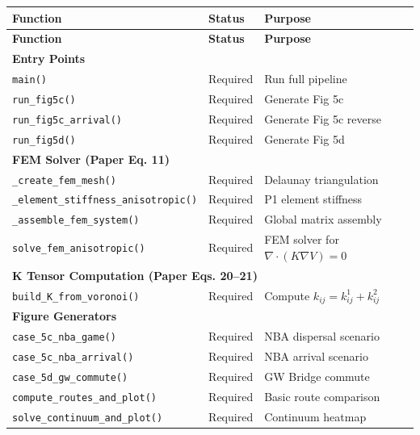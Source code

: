 \documentclass[11pt]{article}
\begin{document}
\begin{longtable}{p{5.5cm}p{2cm}p{6cm}}
\toprule
\textbf{Function} & \textbf{Status} & \textbf{Purpose} \\
\midrule
\endfirsthead
\toprule
\textbf{Function} & \textbf{Status} & \textbf{Purpose} \\
\midrule
\endhead

\multicolumn{3}{l}{\textbf{Entry Points}} \\
\midrule
\texttt{main()} & \textcolor{required}{Required} & Run full pipeline \\
\texttt{run\_fig5c()} & \textcolor{required}{Required} & Generate Fig 5c \\
\texttt{run\_fig5c\_arrival()} & \textcolor{required}{Required} & Generate Fig 5c reverse \\
\texttt{run\_fig5d()} & \textcolor{required}{Required} & Generate Fig 5d \\
\midrule

\multicolumn{3}{l}{\textbf{FEM Solver (Paper Eq. 11)}} \\
\midrule
\texttt{\_create\_fem\_mesh()} & \textcolor{required}{Required} & Delaunay triangulation \\
\texttt{\_element\_stiffness\_anisotropic()} & \textcolor{required}{Required} & P1 element stiffness \\
\texttt{\_assemble\_fem\_system()} & \textcolor{required}{Required} & Global matrix assembly \\
\texttt{solve\_fem\_anisotropic()} & \textcolor{required}{Required} & FEM solver for $\nabla \cdot (K\nabla V) = 0$ \\
\midrule

\multicolumn{3}{l}{\textbf{K Tensor Computation (Paper Eqs. 20--21)}} \\
\midrule
\texttt{build\_K\_from\_voronoi()} & \textcolor{required}{Required} & Compute $k_{ij} = k^1_{ij} + k^2_{ij}$ \\
\midrule

\multicolumn{3}{l}{\textbf{Figure Generators}} \\
\midrule
\texttt{case\_5c\_nba\_game()} & \textcolor{required}{Required} & NBA dispersal scenario \\
\texttt{case\_5c\_nba\_arrival()} & \textcolor{required}{Required} & NBA arrival scenario \\
\texttt{case\_5d\_gw\_commute()} & \textcolor{required}{Required} & GW Bridge commute \\
\texttt{compute\_routes\_and\_plot()} & \textcolor{required}{Required} & Basic route comparison \\
\texttt{solve\_continuum\_and\_plot()} & \textcolor{required}{Required} & Continuum heatmap \\
\midrule


\end{longtable}
\end{document}
